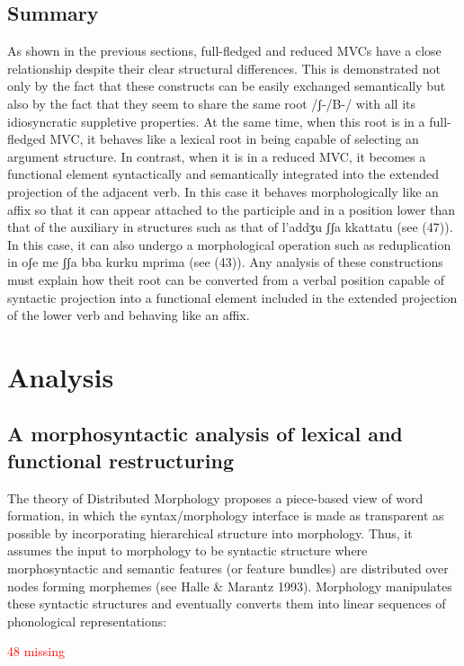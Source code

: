 \documentclass[output=paper,colorlinks,citecolor=brown,
]{langscibook}
\begin{document}
\subsection{Summary}

As shown in the previous sections, full-fledged and reduced MVCs have a close relationship despite their clear structural differences. This is demonstrated not only by the fact that these constructs can be easily exchanged semantically but also by the fact that they seem to share the same root /ʃ-/B-/ with all its idiosyncratic suppletive properties. At the same time, when this root is in a full-fledged MVC, it behaves like a lexical root in being capable of selecting an argument structure.  In contrast, when it is in a reduced MVC, it becomes a functional element syntactically and semantically integrated into the extended projection of the adjacent verb. In this case it behaves morphologically like an affix so that it can appear attached to the participle and in a position lower than that of the auxiliary in structures such as that of l'addʒu ʃʃa kkattatu (see (47)).  In this case, it can also undergo a morphological operation such as reduplication in oʃe me ʃʃa bba kurku mprima (see (43)). Any analysis of these constructions must explain how theit root can be converted from a verbal position capable of syntactic projection into a functional element included in the extended projection of the lower verb and behaving like an affix.

\section{Analysis}
\subsection{A morphosyntactic analysis of lexical and functional restructuring}

The theory of Distributed Morphology proposes a piece-based view of word formation, in which the syntax/morphology interface is made as transparent as possible by incorporating hierarchical structure into morphology. Thus, it assumes the input to morphology to be syntactic structure where morphosyntactic and semantic features (or feature bundles) are distributed over nodes forming morphemes (see Halle \& Marantz 1993). Morphology manipulates these syntactic structures and eventually converts them into linear sequences of phonological representations:
 
\ea \textcolor{red}{48 missing}
\z
\end{document}
